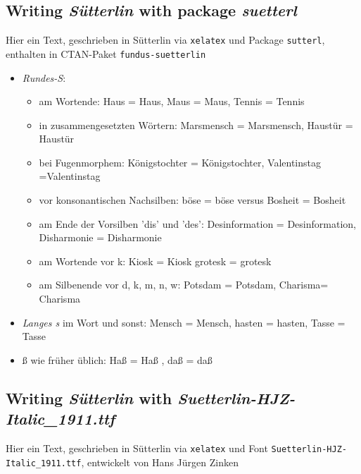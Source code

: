 \documentclass[
  DIV=calc,
  BCOR=5mm,
  11pt,
  headings=small,
  oneside,
  abstract=true,
  toc=bib,
  english,ngerman]{scrartcl}
\begin{document}
\subsection{Writing \textit{Sütterlin} with package \textit{suetterl}}

{\suetterlin Hier ein Text, geschrieben in Sütterlin via \texttt{xelatex} und Package \texttt{sutterl}, enthalten in CTAN-Paket \texttt{fundus-suetterlin}}

\begin{itemize}
  \item \textit{Rundes-S}:
  \begin{itemize}
    \item[\faXmark] am Wortende: Haus = {\suetterlin Haus}, Maus = {\suetterlin Maus}, Tennis = {\suetterlin Tennis} 
    \item[\faXmark] in zusammengesetzten Wörtern: Marsmensch = {\suetterlin Mars\-mensch}, Haustür = {\suetterlin Haus\-tür}
    \item[\faXmark] bei Fugenmorphem: Königstochter = {\suetterlin Königs\-tochter}, Valentinstag ={\suetterlin Valentins\-tag}
    \item[\faXmark] vor konsonantischen Nachsilben: böse = {\suetterlin böse} versus Bosheit = {\suetterlin Bos\-heit}
    \item[\faXmark] am Ende der Vorsilben 'dis' und 'des': Desinformation = {\suetterlin Des\-information}, Disharmonie = {\suetterlin Dis\-harmonie}
    \item[\faXmark] am Wortende vor k: Kiosk = {\suetterlin Kios\-k} grotesk = {\suetterlin grotes\-k}
    \item[\faXmark] am Silbenende vor d, k, m, n, w: Potsdam = {\suetterlin Pots\-dam}, Charisma= {\suetterlin Charis\-ma}
  \end{itemize}
  \item[\faCheck] \textit{Langes s} im Wort und sonst: Mensch = {\suetterlin Mensch}, hasten = {\suetterlin hasten}, Tasse = {\suetterlin Tasse}
  \item[\faCheck] ß wie früher üblich: Haß = {\suetterlin Ha\ss} , daß = {\wesu da\ss} 
  
\end{itemize}

\subsection{Writing \textit{Sütterlin} with \textit{Suetterlin-HJZ-Italic\_1911.ttf}}

{\suetterhjz Hier ein Text, geschrieben in Sütterlin via \texttt{xelatex} und Font \texttt{Suetterlin-HJZ-Italic\_1911.ttf}, entwickelt von Hans {Jürgen Zinken}}
\end{document}
